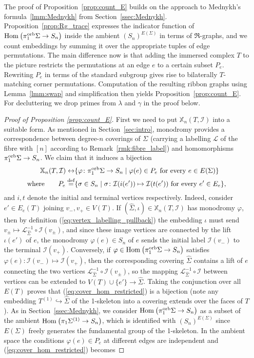 \documentclass{amsart}
\newcommand{\covers}{\mathbb{X}_n}
\newcommand{\defeq}{\stackrel{\tn{def}}{=}}
\newcommand{\Hom}[3][]{\tn{Hom}_{#1}\left(#2\to #3\right)}
\newcommand{\pio}{\pi_1^{\textnormal{orb}}}
\newcommand{\tn}{\textnormal}
\newcommand{\whS}{{\widehat{\Sigma}}}
\begin{document}
The proof of Proposition~\ref{prop:count_E} builds on the approach to Mednykh's formula~\ref{lmm:Mednykh} from Section~\ref{ssec:Mednykh}. Proposition~\ref{prop:Rg_trace} expresses the indicator function of $\Hom{\pio\Sigma}{S_n}$ inside the ambient $(S_n)^{E(\Sigma)}$ in terms of $\mathfrak{R}$-graphs, and we count embeddings by summing it over the appropriate tuples of edge permutations. The main difference now is that adding the immersed complex $T$ to the picture restricts the permutations at an edge $e$ to a certain subset $P_e$. Rewriting $P_e$ in terms of the standard subgroup gives rise to bilaterally $T$-matching corner permutations. Computation of the resulting ribbon graphs using Lemma~\ref{lmm:swap} and simplification then yields Proposition~\ref{prop:count_E}. For decluttering we drop primes from $\lambda$ and $\gamma$ in the proof below.
\begin{proof}[Proof of Proposition \ref{prop:count_E}]
First we need to put $\covers(T,\mathcal{I})$ into a suitable form. As mentioned in Section~\ref{sec:intro}, monodromy provides a correspondence between degree-$n$ coverings of $\Sigma$ (carrying a labelling $\mathcal{L}$ of the fibre with $[n]$ according to Remark~\ref{rmk:fibre_label}) and homomorphisms $\pio\Sigma\to S_n$. We claim that it induces a bijection
\begin{align}\begin{split}\label{eq:cover_hom_restricted}
\covers(T,\mathcal{I})\leftrightarrow&\{\varphi\colon\pio\Sigma\to S_n\mid\varphi(e)\in P_e\text{ for every }e\in E(\Sigma)\}\\
\text{where}\qquad P_e\defeq&\{\sigma\in S_n\mid\sigma\colon\mathcal{I}(i(e'))\mapsto\mathcal{I}(t(e'))\text{ for every }e'\in E_e\},
\end{split}\end{align}
and $i,t$ denote the initial and terminal vertices respectively. Indeed, consider $e'\in E_e(T)$ joining $v_-,v_+\in V(T)$. If $(\whS,\iota)\in\covers(T,\mathcal{I})$ has monodromy $\varphi$, then by definition (\ref{eq:vertex_labelling_pullback}) the embedding $\iota$ must send $v_\pm\mapsto\mathcal{L}_\whS^{-1}\circ\mathcal{I}(v_\pm)$, and since these image vertices are connected by the lift $\iota(e')$ of $e$, the monodromy $\varphi(e)\in S_n$ of $e$ sends the initial label $\mathcal{I}(v_-)$ to the terminal $\mathcal{I}(v_+)$. Conversely, if $\varphi\in\Hom{\pio\Sigma}{S_n}$ satisfies $\varphi(e)\colon\mathcal{I}(v_-)\mapsto\mathcal{I}(v_+)$, then the corresponding covering $\whS$ contains a lift of $e$ connecting the two vertices $\mathcal{L}_\whS^{-1}\circ\mathcal{I}(v_\pm)$, so the mapping $\mathcal{L}_\whS^{-1}\circ\mathcal{I}$ between vertices can be extended to $V(T)\cup\{e'\}\to\whS$. Taking the conjunction over all $E(T)$ proves that (\ref{eq:cover_hom_restricted}) is a bijection (note any embedding $T^{(1)}\hookrightarrow\whS$ of the 1-skeleton into a covering extends over the faces of $T$). As in Section~\ref{ssec:Mednykh}, we consider $\Hom{\pio\Sigma}{S_n}$ as a subset of the ambient $\Hom{\pi_1\Sigma^{(1)}}{S_n}$, which is identified with $(S_n)^{E(\Sigma)}$ since $E(\Sigma)$ freely generates the fundamental group of the 1-skeleton. In the ambient space the conditions $\varphi(e)\in P_e$ at different edges are independent and (\ref{eq:cover_hom_restricted}) becomes

\end{proof}
\end{document}
